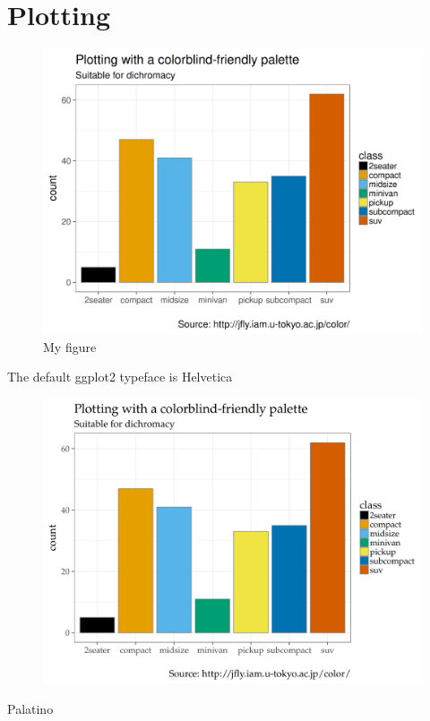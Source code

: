 
\section{Plotting}
\label{sec:plotting}



\begin{frame}
  \begin{figure}[htp!]
    \centering
    \includegraphics[width=0.9\linewidth]{figures/barchart-defaultfont.png}
    \caption{My figure}
  \end{figure}

  \small The default ggplot2 typeface is Helvetica
  
\end{frame}


\begin{frame}
  \begin{figure}[htp!]
    \centering
    \includegraphics[width=0.9\linewidth]{figures/barchart-palatino.png}
  \end{figure}
  
  \small Palatino 
  
\end{frame}

